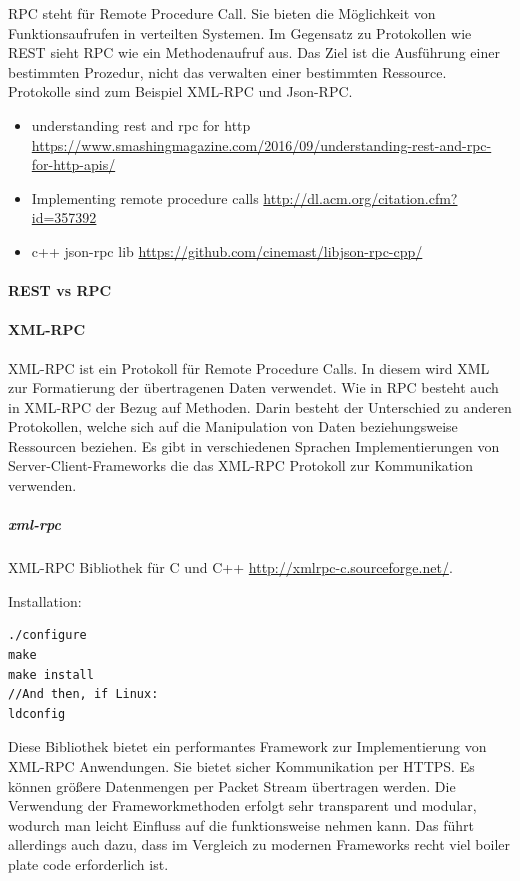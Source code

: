 \documentclass[a4paper,10pt]{article}
\numberwithin{figure}{section}
\numberwithin{table}{section}
\begin{document}

RPC steht für Remote Procedure Call.
Sie bieten die Möglichkeit von Funktionsaufrufen in verteilten Systemen.
Im Gegensatz zu Protokollen wie REST sieht RPC wie ein Methodenaufruf aus.
Das Ziel ist die Ausführung einer bestimmten Prozedur, nicht das verwalten einer bestimmten Ressource.
Protokolle sind zum Beispiel XML-RPC und Json-RPC.

\begin{itemize}
 \item understanding rest and rpc for http \url{https://www.smashingmagazine.com/2016/09/understanding-rest-and-rpc-for-http-apis/}
 \item Implementing remote procedure calls \url{http://dl.acm.org/citation.cfm?id=357392}
 \item c++ json-rpc lib \url{https://github.com/cinemast/libjson-rpc-cpp/}
\end{itemize}

\paragraph{REST vs RPC}


\paragraph{XML-RPC}

XML-RPC ist ein Protokoll für Remote Procedure Calls.
In diesem wird XML zur Formatierung der übertragenen Daten verwendet.
Wie in RPC besteht auch in XML-RPC der Bezug auf Methoden.
Darin besteht der Unterschied zu anderen Protokollen, welche sich auf die Manipulation von Daten beziehungsweise Ressourcen beziehen.
Es gibt in verschiedenen Sprachen Implementierungen von Server-Client-Frameworks die das XML-RPC Protokoll zur Kommunikation verwenden.

\subparagraph{xml-rpc}

XML-RPC Bibliothek für C und C++ \url{http://xmlrpc-c.sourceforge.net/}.

Installation: \\
\begin{lstlisting}[frame=single,caption=XML-RPC Installation, breaklines=true]
./configure
make
make install
//And then, if Linux:
ldconfig
\end{lstlisting}

Diese Bibliothek bietet ein performantes Framework zur Implementierung von XML-RPC Anwendungen.
Sie bietet sicher Kommunikation per HTTPS.
Es können größere Datenmengen per Packet Stream übertragen werden.
Die Verwendung der Frameworkmethoden erfolgt sehr transparent und modular, wodurch man leicht Einfluss auf die funktionsweise nehmen kann.
Das führt allerdings auch dazu, dass im Vergleich zu modernen Frameworks recht viel boiler plate code erforderlich ist.
\end{document}
